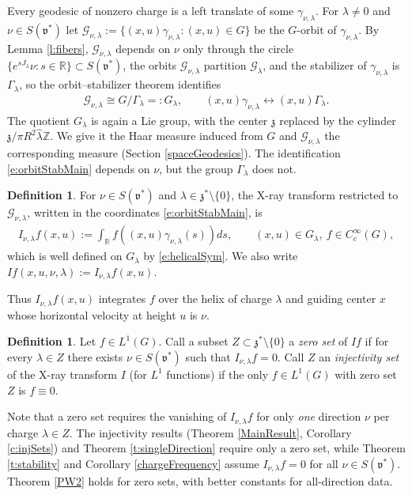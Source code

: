 \documentclass[11pt]{amsart}
\theoremstyle{plain}
\theoremstyle{definition}
\newtheorem{definition}[theorem]{Definition}
\theoremstyle{remark}
\numberwithin{equation}{section}
\def\fz{\mathfrak{z}}
\def\fv{\mathfrak{v}}
\def\cG{\mathcal{G}}
\def\mz{\setminus\{0\}}
\def\R{{\mathbb R}}%
\def\Z{{\mathbb Z}}%
\numberwithin{equation}{section}
\begin{document}
Every geodesic of nonzero charge is a left translate of some $\gamma_{\nu, \lambda}$. For $\lambda\neq0$ and $\nu\in S(\fv^*)$ let $\cG_{\nu, \lambda}:=\{(x, u)\gamma_{\nu, \lambda}: (x, u)\in G\}$ be the $G$-orbit of $\gamma_{\nu, \lambda}$. By Lemma \ref{l:fibers}, $\cG_{\nu, \lambda}$ depends on $\nu$ only through the circle $\{e^{sJ_\lambda}\nu: s\in \R\}\subset S(\fv^*)$, the orbits $\cG_{\nu, \lambda}$ partition $\cG_\lambda$, and the stabilizer of $\gamma_{\nu, \lambda}$ is $\Gamma_\lambda$, so the orbit--stabilizer theorem identifies
\begin{align}\label{e:orbitStabMain}
	\cG_{\nu, \lambda}\cong G/\Gamma_\lambda=:G_\lambda, \qquad (x, u)\gamma_{\nu, \lambda}\longleftrightarrow(x, u)\Gamma_\lambda.
\end{align}
The quotient $G_\lambda$ is again a Lie group, with the center $\fz$ replaced by the cylinder $\fz/\pi R^2\hat\lambda\Z$. We give it the Haar measure induced from $G$ and $\cG_{\nu, \lambda}$ the corresponding measure (Section \ref{spaceGeodesics}). The identification \eqref{e:orbitStabMain} depends on $\nu$, but the group $\Gamma_\lambda$ does not.

\begin{definition}
	For $\nu\in S(\fv^*)$ and $\lambda\in \fz^*\mz$, the X-ray transform restricted to $\cG_{\nu, \lambda}$, written in the coordinates \eqref{e:orbitStabMain}, is
	\begin{align*}
		I_{\nu, \lambda}f(x, u):=\int_\R f\left((x, u)\gamma_{\nu, \lambda}(s)\right)ds, \qquad (x, u)\in G_\lambda,\ f\in C_c^\infty(G),
	\end{align*}
	which is well defined on $G_\lambda$ by \eqref{e:helicalSym}. We also write $If(x, u, \nu, \lambda):=I_{\nu, \lambda}f(x, u)$.
\end{definition}
Thus $I_{\nu, \lambda}f(x, u)$ integrates $f$ over the helix of charge $\lambda$ and guiding center $x$ whose horizontal velocity at height $u$ is $\nu$.


\begin{definition}
	Let $f\in L^1(G)$. Call a subset $Z\subset \fz^*\mz$ a \textit{zero set} of $If$ if for every $\lambda\in Z$ there exists $\nu\in S(\fv^*)$ such that $I_{\nu, \lambda}f=0$. Call $Z$ an  \textit{injectivity set} of the X-ray transform $I$ (for $L^1$ functions) if the only $f\in L^1(G)$ with zero set $Z$ is $f\equiv 0$.
\end{definition}
Note that a zero set requires the vanishing of $I_{\nu, \lambda}f$ for only \textit{one} direction $\nu$ per charge $\lambda\in Z$. The injectivity results (Theorem \ref{MainResult}, Corollary \ref{c:injSets}) and Theorem \ref{t:singleDirection} require only a zero set, while Theorem \ref{t:stability} and Corollary \ref{chargeFrequency} assume $I_{\nu, \lambda}f=0$ for all $\nu\in S(\fv^*)$. Theorem \ref{PW2} holds for zero sets, with better constants for all-direction data.
\end{document}
